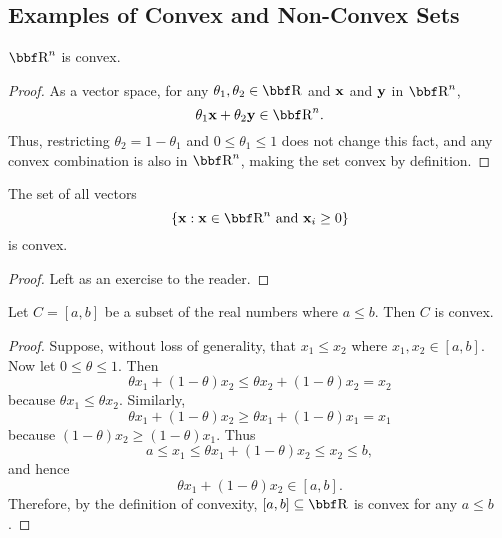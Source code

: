 \documentclass{article}
\begin{document}
\subsection{Examples of Convex and Non-Convex Sets}

\begin{example}
    $\RR^n$ is convex.
\end{example}
\begin{proof}
    As a vector space, for any $\theta_1,\theta_2 \in \RR$ and ${\bf x}$ and
    ${\bf y}$ in $\RR^n$,
    \[
        \theta_1 \xx + \theta_2 \yy \in \RR^n.
    \]
    Thus, restricting $\theta_2 = 1-\theta_1$ and $0\leq\theta_1\leq1$
    does not change this fact, and any convex combination is also in
    $\RR^n$, making the set convex by definition.
\end{proof}

\begin{example}
    The set of all vectors
    \[
        \{\xx : \xx\in\RR^n \text{ and } \xx_i \geq 0\}
    \]
    is convex.
\end{example}
\begin{proof}
    Left as an exercise to the reader.
\end{proof}

\begin{example}
    Let $C = [a,b]$ be a subset of the real numbers where $a \leq b$.
    Then $C$ is convex.
\end{example}
\begin{proof}
    Suppose, without loss of generality, that $x_1 \leq x_2$ where
    $x_1,x_2 \in [a,b]$. Now let $0\leq\theta\leq1$. Then
    \[
        \theta x_1 + (1-\theta) x_2 \leq \theta x_2 + (1-\theta) x_2 = x_2
    \]
    because $\theta x_1 \leq \theta x_2$. Similarly,
    \[
        \theta x_1 + (1-\theta) x_2 \geq \theta x_1 + (1-\theta) x_1 = x_1
    \]
    because $(1-\theta) x_2 \geq (1-\theta) x_1$. Thus
    \[
        a \leq x_1 \leq \theta x_1 + (1-\theta) x_2 \leq x_2 \leq b,
    \]
    and hence
    \[
        \theta x_1 + (1-\theta) x_2 \in [a,b].
    \]
    Therefore, by the definition of convexity, $[a,b]\subseteq\RR$ is convex
    for any $a \leq b$.
\end{proof}
\end{document}
